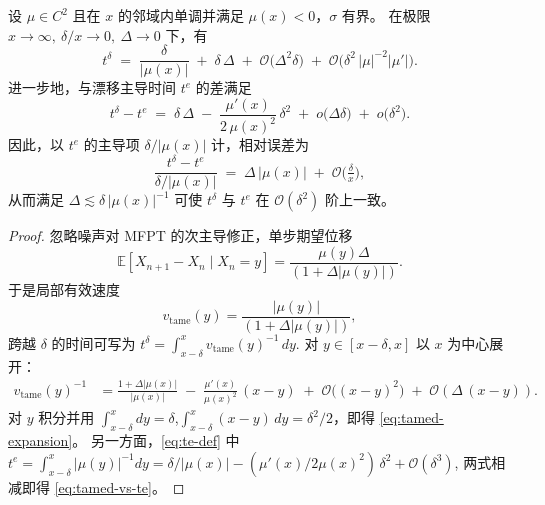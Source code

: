 \begin{theorem}\label{thm:tamed-mfpt}
	设 \(\mu\in C^{2}\) 且在 \(x\) 的邻域内单调并满足 \(\mu(x)<0\)，\(\sigma\) 有界。
	在极限 \(x\to\infty,\ \delta/x\to0,\ \Delta\to0\) 下，有
	\begin{equation}\label{eq:tamed-expansion}
		t^{\delta}
		\;=\;
		\frac{\delta}{\lvert \mu(x)\rvert}
		\;+\;\delta\,\Delta
		\;+\;\mathcal O\!\Big(\Delta^{2}\delta\Big)
		\;+\;\mathcal O\!\Big(\delta^{2}\,\lvert \mu\rvert^{-2}\lvert \mu'\rvert\Big).
	\end{equation}
	进一步地，与漂移主导时间 \(t^{e}\) 的差满足
	\begin{equation}\label{eq:tamed-vs-te}
		t^{\delta} -t^{e}
		\;=\;
		\delta\,\Delta
		\;-\;\frac{\mu'(x)}{2\,\mu(x)^{2}}\,\delta^{2}
		\;+\;o\!\Big(\Delta\delta\Big)
		\;+\;o\!\Big(\delta^{2}\Big).
	\end{equation}
	因此，以 \(t^{e}\) 的主导项 \(\delta/\lvert\mu(x)\rvert\) 计，相对误差为
	\[
	\frac{t^{\delta}-t^{e}}{\delta/\lvert\mu(x)\rvert}
	\;=\;
	\Delta\,\lvert\mu(x)\rvert
	\;+\;\mathcal O\!\Big(\tfrac{\delta}{x}\Big),
	\]
	从而满足
	\(
	\Delta\lesssim \delta\,\lvert\mu(x)\rvert^{-1}
	\)
	可使 \(t^{\delta}\) 与 \(t^{e}\) 在 \(\mathcal O(\delta^{2})\) 阶上一致。
\end{theorem}

\begin{proof}
	忽略噪声对 MFPT 的次主导修正，单步期望位移
	\[
	\mathbb E[X_{n+1}-X_n\mid X_n=y]
	=
	\frac{\mu(y)\Delta}{(1+\Delta\lvert\mu(y)\rvert)}.
	\]
	于是局部有效速度
	\[
	v_{\mathrm{tame}}(y)=\frac{\lvert\mu(y)\rvert}{(1+\Delta\lvert\mu(y)\rvert)},
	\]
	跨越 \(\delta\) 的时间可写为
	\(
	t^{\delta}=\int_{x-\delta}^{x} v_{\mathrm{tame}}(y)^{-1}\,dy
	\).
	对 \(y\in[x-\delta,x]\) 以 \(x\) 为中心展开：
	\begin{align}
	v_{\mathrm{tame}}(y)^{-1} 
	&=
	\frac{1+\Delta\lvert\mu(x)\rvert}{\lvert\mu(x)\rvert}
	\;-\;\frac{\mu'(x)}{\mu(x)^{2}}\,(x-y)
	\;+\;\mathcal O\!\big((x-y)^{2}\big)
	\;+\;\mathcal O(\Delta\,(x-y)).
	\end{align}
	对 \(y\) 积分并用
	\(\int_{x-\delta}^{x}dy=\delta\),\(\int_{x-\delta}^{x}(x-y)\,dy=\delta^{2}/2\)，即得
	\eqref{eq:tamed-expansion}。
	另一方面，\eqref{eq:te-def} 中
	\(
	t^{e}=\int_{x-\delta}^{x}\lvert\mu(y)\rvert^{-1}dy
	=
	\delta/\lvert\mu(x)\rvert-(\mu'(x)/2\mu(x)^{2})\,\delta^{2}+\mathcal O(\delta^{3})
	\),
	两式相减即得 \eqref{eq:tamed-vs-te}。
\end{proof}


